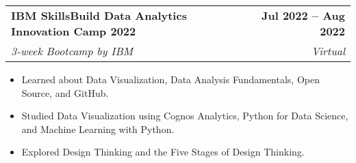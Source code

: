 \documentclass[letterpaper,11pt]{article}
\makeatletter
\newcommand{\resumeItem}[1]{
  \item\small{#1\vspace{-2pt}}
}
\newcommand{\resumeSubheading}[4]{
  \vspace{-2pt}\item
    \begin{tabular*}{1.0\textwidth}[t]{l@{\extracolsep{\fill}}r}
      \textbf{#1} & \textbf{\small #2} \\ 
      \textit{\small #3} & \textit{\small #4} \\
    \end{tabular*}\vspace{-7pt}
}
\newcommand{\resumeItemListStart}{\begin{itemize}}
\newcommand{\resumeItemListEnd}{\end{itemize}\vspace{-5pt}}
\makeatother
\begin{document}
    \resumeSubheading
      {IBM SkillsBuild Data Analytics Innovation Camp 2022}{Jul 2022 -- Aug 2022}
      {3-week Bootcamp by IBM}{Virtual}
      \resumeItemListStart
        \resumeItem{Learned about Data Visualization, Data Analysis Fundamentals, Open Source, and GitHub.}
        \resumeItem{Studied Data Visualization using Cognos Analytics, Python for Data Science, and Machine Learning with Python.}
        \resumeItem{Explored Design Thinking and the Five Stages of Design Thinking.}
      \resumeItemListEnd
    
 
\end{document}
